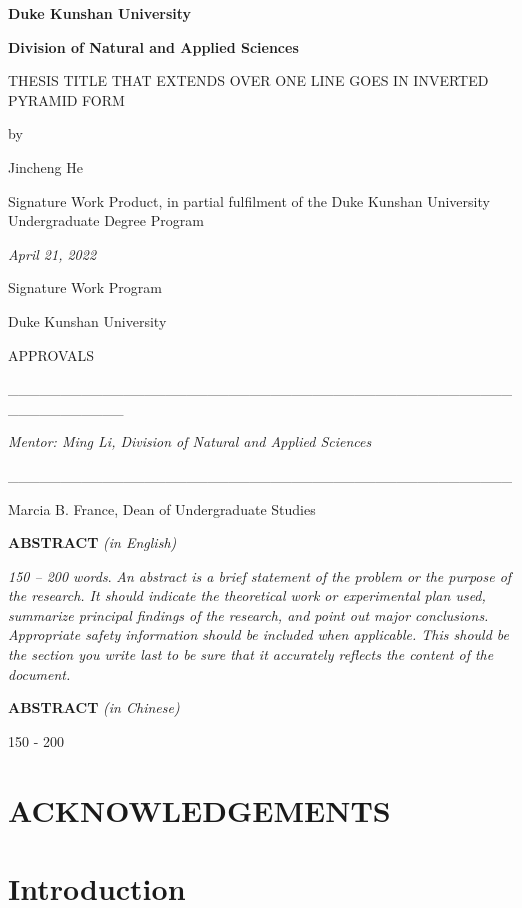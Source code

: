 \documentclass[
]{article}
\author{}
\date{}
\begin{document}
    \textbf{Duke Kunshan University}

    \textbf{Division of Natural and Applied Sciences}

    THESIS TITLE THAT EXTENDS OVER ONE LINE GOES IN INVERTED PYRAMID FORM

    by

    Jincheng He

    Signature Work Product, in partial fulfilment of the Duke Kunshan
    University Undergraduate Degree Program

    \emph{April 21, 2022}

    Signature Work Program

    Duke Kunshan University

    APPROVALS

    \_\_\_\_\_\_\_\_\_\_\_\_\_\_\_\_\_\_\_\_\_\_\_\_\_\_\_\_\_\_\_\_\_\_\_\_\_\_\_\_\_\_\_\_\_\_\_\_\_\_\_\_\_\_\_\_\_\_\_

    \emph{Mentor: Ming Li, Division of Natural and Applied Sciences}

    \_\_\_\_\_\_\_\_\_\_\_\_\_\_\_\_\_\_\_\_\_\_\_\_\_\_\_\_\_\_\_\_\_\_\_\_\_\_\_\_\_\_\_\_\_\_\_\_

    Marcia B. France, Dean of Undergraduate Studies

    \textbf{ABSTRACT} \emph{(in English)}

    \emph{150 -- 200 words}. \emph{An abstract is a brief statement of the
    problem or the purpose of the research. It should indicate the
    theoretical work or experimental plan used, summarize principal findings
    of the research, and point out major conclusions. Appropriate safety
    information should be included when applicable. This should be the
    section you write last to be sure that it accurately reflects the
    content of the document.}

    \textbf{ABSTRACT} \emph{(in Chinese)}

    150 - 200


    \section{ACKNOWLEDGEMENTS}\label{acknowledgements}


    \tableofcontents


    \section{Introduction}
    \label{sec:intro}
\end{document}
